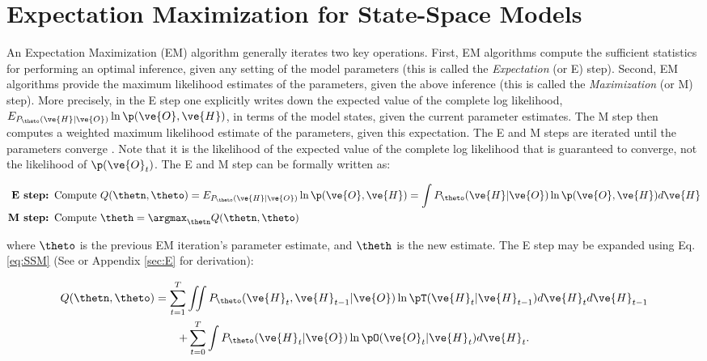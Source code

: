 \documentclass{article}
\begin{document}
\section{Expectation Maximization for State-Space Models}

An Expectation Maximization (EM) algorithm generally iterates two key operations.  First, EM algorithms compute the sufficient statistics for performing an optimal inference, given any setting of the model parameters (this is called the \emph{Expectation} (or E) step).  Second, EM algorithms provide the maximum likelihood estimates of the parameters, given the above inference (this is called the \emph{Maximization} (or M) step).  More precisely, in the E step one explicitly writes down the expected value of the complete log likelihood, $E_{P_{\theto}(\ve{H} | \ve{O})} \ln \p (\ve{O}, \ve{H})$, in terms of the model states, given the current parameter estimates.  The M step then computes a weighted maximum likelihood estimate of the parameters, given this expectation. The E and M steps  are iterated until the parameters converge \cite{ShumwayStoffer06}. Note that it is the likelihood of the expected value of the complete log likelihood that is guaranteed to converge, not the likelihood of $\p (\ve{O}_t)$.  The E and M step can be formally written as:

\begin{align*}
\textbf{E step: } \text{Compute } & Q(\thetn,\theto) = E_{P_{\theto}(\ve{H} | \ve{O})} \ln \p (\ve{O},\ve{H}) = \int P_{\theto}(\ve{H} | \ve{O}) \ln \p (\ve{O}, \ve{H}) d\ve{H}\\
\textbf{M step: } \text{Compute }& \theth = \argmax_{\thetn} Q(\thetn,\theto)
\end{align*}

\noindent where $\theto$ is the previous EM iteration's parameter estimate, and $\theth$ is the new estimate. The E step may be expanded using Eq. \ref{eq:SSM} (See \cite{Rabiner89} or Appendix \ref{sec:E} for derivation):

\begin{multline} \label{eq:E_HMM}
Q(\thetn,\theto) = \sum_{t=1}^T \iint
 P_{\theto} (\ve{H}_t,\ve{H}_{t-1} | \ve{O})  \ln \pT
(\ve{H}_t |  \ve{H}_{t-1}) d\ve{H}_t d\ve{H}_{t-1} \\
+ \sum_{t=0}^T \int P_{\theto} (\ve{H}_t |  \ve{O}) \ln
\pO (\ve{O}_t |  \ve{H}_t) d\ve{H}_t.
\end{multline}
\end{document}
